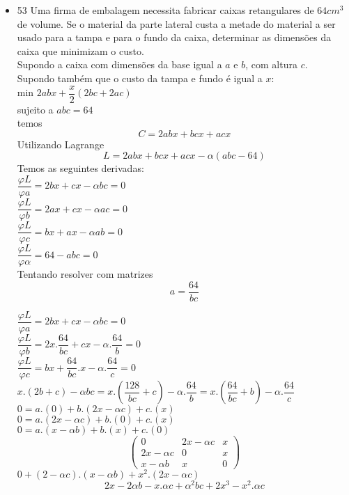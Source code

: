 \documentclass{article}
\begin{document}
\begin{itemize}
	\item 53 Uma firma de embalagem necessita fabricar caixas retangulares de $64 cm^3$ de volume. Se o material da parte lateral custa a metade do material a ser usado para a tampa e para o fundo da caixa, determinar as dimensões da caixa que minimizam o custo.\\
	Supondo a caixa com dimensões da base igual a $a$ e $b$, com altura $c$.\\
	Supondo também  que o custo da tampa e fundo é igual a $x$:\\
	min $2abx+\dfrac{x}{2}(2bc + 2ac)$\\
	sujeito a $abc = 64$\\
	temos
	$$C = 2abx + bcx+acx$$
	Utilizando Lagrange
	$$L = 2abx+bcx+acx - \alpha(abc-64)$$
	Temos as seguintes derivadas:\\
	$\dfrac{\varphi L}{\varphi a} = 2bx+cx-\alpha bc =0$\\
	$\dfrac{\varphi L}{\varphi b} = 2ax + cx- \alpha ac =0$\\
	$\dfrac{\varphi L}{\varphi c} = bx+ax-\alpha ab =0$\\
	$\dfrac{\varphi L}{\varphi \alpha} = 64 - abc =0$\\
	Tentando resolver com matrizes\\
	$$a=\dfrac{64}{bc}$$
	
	$\dfrac{\varphi L}{\varphi a} = 2bx+cx-\alpha bc =0$\\
	$\dfrac{\varphi L}{\varphi b} = 2x.\dfrac{64}{bc} + cx- \alpha .\dfrac{64}{b} =0$\\
	$\dfrac{\varphi L}{\varphi c} = bx+\dfrac{64}{bc}.x-\alpha.\dfrac{64}{c} =0$\\
	$x.(2b+c)-\alpha bc = x.(\dfrac{128}{bc}+c)-\alpha .\dfrac{64}{b} = x.(\dfrac{64}{bc}+b)-\alpha. \dfrac{64}{c}$
	\newpage
	$0=a.(0) + b.(2x-\alpha c)+ c.(x)$\\
	$0=a.(2x-\alpha c) +b.(0) + c.(x)$\\
	$0=a.(x-\alpha b)+b.(x)+c.(0)$\\

	\begin{equation}
	\begin{pmatrix}
		0&2x-\alpha c & x\\
		2x-\alpha c & 0 & x\\
		x-\alpha b & x & 0
	\end{pmatrix}
		\end{equation}
	$0+(2-\alpha c).(x-\alpha b) +x^2.(2x-\alpha c)$
	$$2x-2\alpha b -x.\alpha c + \alpha^2bc+2x^3-x^	2.\alpha c$$
	


\end{itemize}
\end{document}
